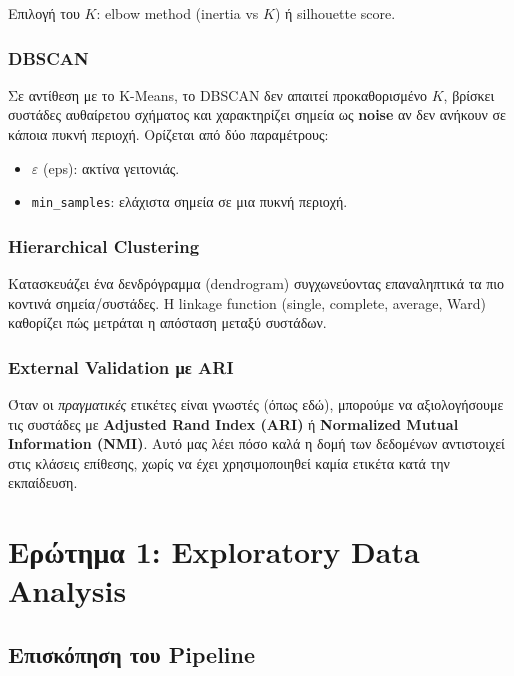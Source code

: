 \documentclass[12pt,a4paper,twoside]{book}
\begin{document}
Επιλογή του \(K\): elbow method (inertia vs \(K\)) ή silhouette score.

\subsection{DBSCAN}

Σε αντίθεση με το K-Means, το DBSCAN δεν απαιτεί προκαθορισμένο \(K\),
βρίσκει συστάδες αυθαίρετου σχήματος και χαρακτηρίζει σημεία ως
\textbf{noise} αν δεν ανήκουν σε κάποια πυκνή περιοχή. Ορίζεται από δύο
παραμέτρους:
\begin{itemize}
    \item \(\varepsilon\) (eps): ακτίνα γειτονιάς.
    \item \texttt{min\_samples}: ελάχιστα σημεία σε μια πυκνή περιοχή.
\end{itemize}

\subsection{Hierarchical Clustering}

Κατασκευάζει ένα δενδρόγραμμα (dendrogram) συγχωνεύοντας επαναληπτικά τα
πιο κοντινά σημεία/συστάδες. Η linkage function (single, complete,
average, Ward) καθορίζει πώς μετράται η απόσταση μεταξύ συστάδων.

\subsection{External Validation με ARI}

Όταν οι \textit{πραγματικές} ετικέτες είναι γνωστές (όπως εδώ), μπορούμε
να αξιολογήσουμε τις συστάδες με \textbf{Adjusted Rand Index (ARI)} ή
\textbf{Normalized Mutual Information (NMI)}. Αυτό μας λέει πόσο καλά η
δομή των δεδομένων αντιστοιχεί στις κλάσεις επίθεσης, χωρίς να έχει
χρησιμοποιηθεί καμία ετικέτα κατά την εκπαίδευση.

\chapter{Ερώτημα 1: Exploratory Data Analysis}

\section{Επισκόπηση του Pipeline}
\end{document}
